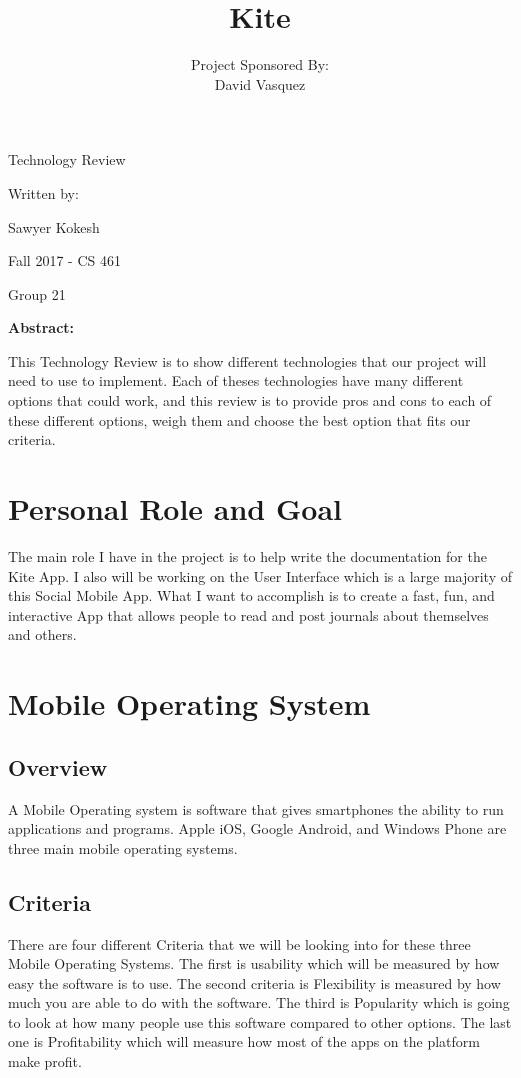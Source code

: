 \documentclass[compsoc, 10, draftclsnofoot, onecolumn]{IEEEtran}
\date{}
\title{Kite}
\author{ %
	Project Sponsored By: \\
    David Vasquez
}
\begin{document}
\null  %
\nointerlineskip  %
\vfill
\let\snewpage \newpage
\let\newpage \relax
\maketitle
\begin{center}
\huge{Technology Review}\par
\vspace{2mm}
\large{Written by:}\par
\normalsize{Sawyer Kokesh}\par
\vspace{2mm}
\normalsize{Fall 2017 - CS 461}\par
\vspace{4mm}
\large{Group 21}\par
\vspace{8mm}
\large{\textbf{Abstract:}}\par 
\vspace{2mm}
\normalsize{This Technology Review is to show different technologies that our project will need to use to implement. Each of theses technologies have many different options that could work, and this review is to provide pros and cons to each of these different options, weigh them and choose the best option that fits our criteria.}
\end{center}
\let \newpage \snewpage
\vfill 
\break %
\section*{\textbf{Personal Role and Goal}} The main role I have in the project is to help write the documentation for the Kite App. I also will be working on the User Interface which is a large majority of this Social Mobile App. What I want to accomplish is to create a fast, fun, and interactive App that allows people to read and post journals about themselves and others.  
\section{\textbf{Mobile Operating System}}
\subsection{Overview} A Mobile Operating system is software that gives smartphones the ability to run applications and programs. Apple iOS, Google Android, and Windows Phone are three main mobile operating systems. 
\subsection{Criteria} There are four different Criteria that we will be looking into for these three Mobile Operating Systems. The first is usability which will be measured by how easy the software is to use. The second criteria is Flexibility is measured by how much you are able to do with the software. The third is Popularity which is going to look at how many people use this software compared to other options. The last one is Profitability which will measure how most of the apps on the platform make profit.
\end{document}

